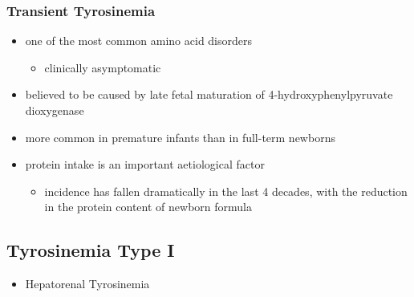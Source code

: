 \documentclass{scrartcl}
\begin{document}
\subsubsection{Transient Tyrosinemia}
\label{sec:org9a77ab6}
\begin{itemize}
\item one of the most common amino acid disorders
\begin{itemize}
\item clinically asymptomatic
\end{itemize}
\item believed to be caused by late fetal maturation of
4-hydroxyphenylpyruvate dioxygenase
\item more common in premature infants than in full-term newborns
\item protein intake is an important aetiological factor
\begin{itemize}
\item incidence has fallen dramatically in the last 4 decades, with the
reduction in the protein content of newborn formula
\end{itemize}
\end{itemize}


\subsection{Tyrosinemia Type I}
\label{sec:org6703d83}
\begin{itemize}
\item Hepatorenal Tyrosinemia
\end{itemize}
\end{document}
